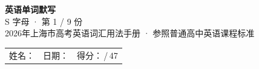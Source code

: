 \documentclass[10pt,a4paper]{article}
\begin{document}
\pagestyle{plain}

\begin{center}
{\LARGE\bfseries 英语单词默写}\\[0.22em]
{\large S 字母 · 第 1 / 9 份}\\[0.18em]
{\small 2026年上海市高考英语词汇用法手册 · 参照普通高中英语课程标准}
\end{center}

\vspace{0.25em}
\noindent\begin{tabular}{@{}p{}@{}p{}@{}p{}@{}}
姓名：\underline{\hspace{2.0cm}} & 日期：\underline{\hspace{2.0cm}} & 得分：\underline{\hspace{1.3cm}}\,/\,47 \\
\end{tabular}

\vspace{0.3em}

\vspace{0.08em}
\end{document}
